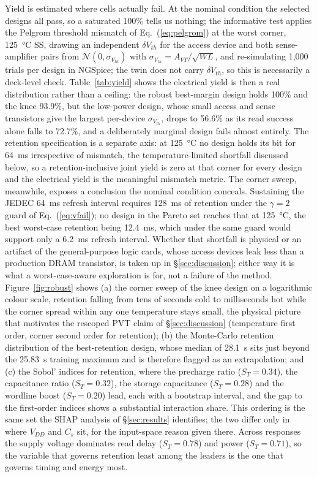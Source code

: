\documentclass[11pt,a4paper]{article}
\newcommand{\Cs}{C_{s}}
\begin{document}
Yield is estimated where cells actually fail. At the nominal condition the selected
designs all pass, so a saturated 100\% tells us nothing; the informative test
applies the Pelgrom threshold mismatch of Eq.~(\ref{eq:pelgrom}) at the worst
corner, \SI{125}{\celsius} SS, drawing an independent $\delta V_{th}$ for the access
device and both sense-amplifier pairs from $\mathcal{N}(0,\sigma_{V_{th}})$ with
$\sigma_{V_{th}}=A_{VT}/\sqrt{WL}$, and re-simulating 1{,}000 trials per design in
NGSpice; the twin does not carry $\delta V_{th}$, so this is necessarily a
deck-level check. Table~\ref{tab:yield} shows the electrical yield is then a real
distribution rather than a ceiling: the robust best-margin design holds 100\% and
the knee 93.9\%, but the low-power design, whose small access and sense transistors
give the largest per-device $\sigma_{V_{th}}$, drops to 56.6\% as its read success
alone falls to 72.7\%, and a deliberately marginal design fails almost entirely.
The retention specification is a separate axis: at \SI{125}{\celsius} no design
holds its bit for \SI{64}{\milli\second} irrespective of mismatch, the
temperature-limited shortfall discussed below, so a retention-inclusive joint yield
is zero at that corner for every design and the electrical yield is the meaningful
mismatch metric. The corner sweep, meanwhile,
exposes a conclusion the nominal condition conceals. Sustaining the JEDEC
\SI{64}{\milli\second} refresh interval requires \SI{128}{\milli\second} of
retention under the $\gamma=2$ guard of Eq.~(\ref{eq:vfail}); no design in the
Pareto set reaches that at \SI{125}{\celsius}, the best worst-case retention being
\SI{12.4}{\milli\second}, which under the same guard would support only a
\SI{6.2}{\milli\second} refresh interval. Whether that shortfall is physical or an
artifact of the general-purpose logic cards, whose access devices leak less than a
production DRAM transistor, is taken up in \S\ref{sec:discussion}; either way it is
what a worst-case-aware exploration is for, not a failure of the method.
Figure~\ref{fig:robust} shows (a) the corner sweep of the knee design on a
logarithmic colour scale, retention falling from tens of seconds cold to
milliseconds hot while the corner spread within any one temperature stays small,
the physical picture that motivates the rescoped PVT claim of \S\ref{sec:discussion}
(temperature first order, corner second order for retention); (b) the Monte-Carlo
retention distribution of the best-retention design, whose median of \SI{28.1}{\second}
sits just beyond the \SI{25.83}{\second} training maximum and is therefore flagged
as an extrapolation; and (c) the Sobol' indices for retention, where the precharge
ratio ($S_T=0.34$), the capacitance ratio ($S_T=0.32$), the storage capacitance
($S_T=0.28$) and the wordline boost ($S_T=0.20$) lead, each with a bootstrap
interval, and the gap to the first-order indices shows a substantial interaction
share. This ordering is the same set the SHAP analysis of \S\ref{sec:results}
identifies; the two differ only in where $V_{DD}$ and $\Cs$ sit, for the
input-space reason given there. Across responses the supply voltage dominates read
delay ($S_T=0.78$) and power ($S_T=0.71$), so the variable that governs retention
least among the leaders is the one that governs timing and energy most.
\end{document}
